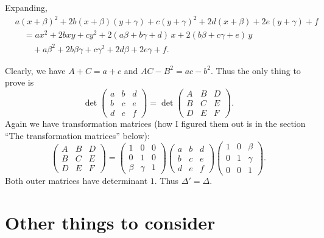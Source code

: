 \begin{calc}
Expanding,
\[
\begin{aligned}
&a(x+\beta)^2 + 2b(x+\beta)(y+\gamma) + c(y+\gamma)^2 + 2d(x+\beta) + 2e(y+\gamma) + f \\
&\quad= ax^2 + 2bxy + cy^2 + 2(a\beta + b\gamma + d)\,x + 2(b\beta + c\gamma + e)\,y \\
&\qquad + a\beta^2 + 2b\beta\gamma + c\gamma^2 + 2d\beta + 2e\gamma + f .
\end{aligned}
\]
\end{calc}

Clearly, we have $A + C = a + c$ and $AC - B^2 = ac - b^2$. Thus the only thing to prove is
\[
\det \begin{pmatrix} a & b & d \\ b & c & e \\ d & e & f \end{pmatrix}
= \det \begin{pmatrix} A & B & D \\ B & C & E \\ D & E & F \end{pmatrix}.
\]
Again we have transformation matrices (how I figured them out is in the section ``The transformation matrices'' below):
\[
\begin{pmatrix} A & B & D \\ B & C & E \\ D & E & F \end{pmatrix}
= \begin{pmatrix} 1 & 0 & 0 \\ 0 & 1 & 0 \\ \beta & \gamma & 1 \end{pmatrix}
\begin{pmatrix} a & b & d \\ b & c & e \\ d & e & f \end{pmatrix}
\begin{pmatrix} 1 & 0 & \beta \\ 0 & 1 & \gamma \\ 0 & 0 & 1 \end{pmatrix}.
\]
Both outer matrices have determinant $1$. Thus $\Delta' = \Delta$.

\section{Other things to consider}

